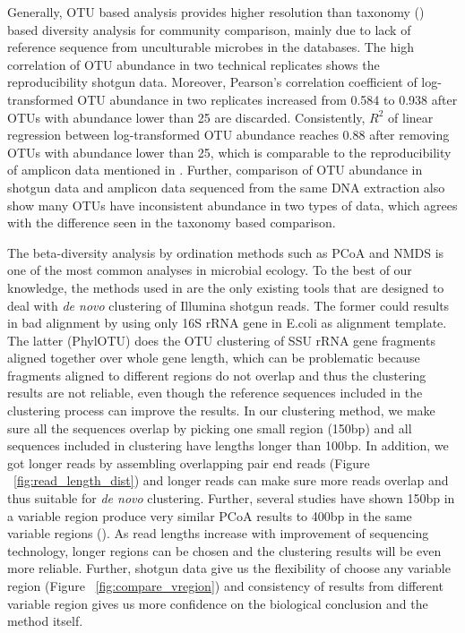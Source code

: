 \documentclass[12pt]{article}
\begin{document}
Generally, OTU based analysis provides higher resolution than taxonomy
(\cite{patotuasse2011}) based diversity analysis for community
comparison, mainly due to lack of reference sequence from unculturable
microbes in the databases. The high correlation of OTU abundance in
two technical replicates shows the reproducibility shotgun
data. Moreover, Pearson’s correlation coefficient of log-transformed
OTU abundance in two replicates increased from 0.584 to 0.938 after
OTUs with abundance lower than 25 are discarded. Consistently, $R^2$
of linear regression between log-transformed OTU abundance reaches
0.88 after removing OTUs with abundance lower than 25, which is
comparable to the reproducibility of amplicon data mentioned
in \cite{arabdopsis}. Further, comparison of OTU abundance in shotgun
data and amplicon data sequenced from the same DNA extraction also
show many OTUs have inconsistent abundance in two types of data, which
agrees with the difference seen in the taxonomy based comparison.

The beta-diversity analysis by ordination methods such as PCoA and
NMDS is one of the most common analyses in microbial ecology. To the
best of our knowledge, the methods used in \cite{kostas2013,phylotu}
are the only existing tools that are designed to deal with {\em de
novo} clustering of Illumina shotgun reads. The former could results
in bad alignment by using only 16S rRNA gene in E.coli as alignment
template. The latter (PhylOTU) does the OTU clustering of SSU rRNA
gene fragments aligned together over whole gene length, which can be
problematic because fragments aligned to different regions do not
overlap and thus the clustering results are not reliable, even though
the reference sequences included in the clustering process can improve
the results. In our clustering method, we make sure all the sequences
overlap by picking one small region (150bp) and all sequences included
in clustering have lengths longer than 100bp. In addition, we got
longer reads by assembling overlapping pair end reads (Figure
~\ref{fig:read_length_dist}) and longer reads can make sure more reads
overlap and thus suitable for {\em de novo} clustering. Further,
several studies have shown 150bp in a variable region produce very
similar PCoA results to 400bp in the same variable regions
(\cite{robknight2007,caporaso2012miseq}). As read lengths increase
with improvement of sequencing technology, longer regions can be
chosen and the clustering results will be even more reliable. Further,
shotgun data give us the flexibility of choose any variable region
(Figure ~\ref{fig:compare_vregion}) and consistency of results from
different variable region gives us more confidence on the biological
conclusion and the method itself.
\end{document}
